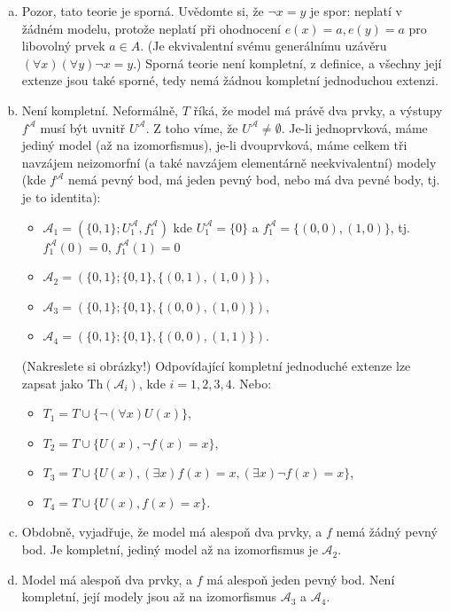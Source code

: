 \begin{problem}
    \begin{solution}
        \begin{enumerate}[(a)]
            \item Pozor, tato teorie je sporná. Uvědomte si, že $\neg x=y$ je spor: neplatí v žádném modelu, protože neplatí při ohodnocení $e(x)=a,e(y)=a$ pro libovolný prvek $a\in A$. (Je ekvivalentní svému generálnímu uzávěru $(\forall x)(\forall y)\neg x=y$.) Sporná teorie není kompletní, z definice, a všechny její extenze jsou také sporné, tedy nemá žádnou kompletní jednoduchou extenzi.
            \item Není kompletní. Neformálně, $T$ říká, že model má právě dva prvky, a výstupy $f^\mathcal A$ musí být uvnitř $U^\mathcal A$. Z toho víme, že $U^\mathcal A\neq\emptyset$. Je-li jednoprvková, máme jediný model (až na izomorfismus), je-li dvouprvková, máme celkem tři navzájem neizomorfní (a také navzájem elementárně neekvivalentní) modely (kde $f^\mathcal A$ nemá pevný bod, má jeden pevný bod, nebo má dva pevné body, tj. je to identita):
            \begin{itemize}
                \item $\mathcal A_1=(\{0,1\};U^\mathcal A_1,f^\mathcal A_1)$ kde $U^\mathcal A_1=\{0\}$ a $f^\mathcal A_1=\{(0,0),(1,0)\}$, tj. $f^\mathcal A_1(0)=0$, $f^\mathcal A_1(1)=0$
                \item $\mathcal A_2=(\{0,1\};\{0,1\},\{(0,1),(1,0)\})$,
                \item $\mathcal A_3=(\{0,1\};\{0,1\},\{(0,0),(1,0)\})$,
                \item $\mathcal A_4=(\{0,1\};\{0,1\},\{(0,0),(1,1)\})$.
            \end{itemize} 
            (Nakreslete si obrázky!) Odpovídající kompletní jednoduché extenze lze zapsat jako $\mathrm{Th}(\mathcal A_i)$, kde $i=1,2,3,4$. Nebo:
            \begin{itemize}
                \item $T_1=T\cup\{\neg (\forall x) U(x)\}$,
                \item $T_2=T\cup\{U(x),\neg f(x)=x\}$,
                \item $T_3=T\cup\{U(x),(\exists x)f(x)=x,(\exists x)\neg f(x)=x\}$,
                \item $T_4=T\cup\{U(x),f(x)=x\}$.
            \end{itemize}
            \item Obdobně, vyjadřuje, že model má alespoň dva prvky, a $f$ nemá žádný pevný bod. Je kompletní, jediný model až na izomorfismus je $\mathcal A_2$.
            \item Model má alespoň dva prvky, a $f$ má alespoň jeden pevný bod. Není kompletní, její modely jsou až na izomorfismus $\mathcal A_3$ a $\mathcal A_4$.
            

        \end{enumerate}
                    
    \end{solution}

\end{problem}
        
